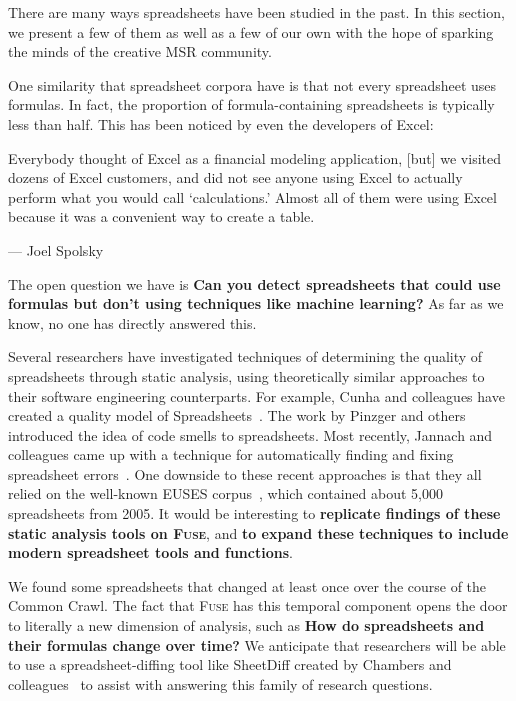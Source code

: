 \documentclass[conference]{IEEEtran}
\begin{document}
There are many ways spreadsheets have been studied in the past.  
In this section, we present a few of them as well as a few of our own with the hope of sparking the minds of the creative MSR community.

One similarity that spreadsheet corpora have is that not every spreadsheet uses formulas.  
In fact, the proportion of formula-containing spreadsheets is typically less than half.
This has been noticed by even the developers of Excel:
\begin{displayquote}
Everybody thought of Excel as a financial modeling application, [but] we visited dozens of Excel customers, and did not see anyone using Excel to actually perform what you would call `calculations.' Almost all of them were using Excel because it was a convenient way to create a table.

 --- Joel Spolsky~\cite{JoelOnSoftware}
\end{displayquote}
The open question we have is \textbf{Can you detect spreadsheets that could use formulas but don't using techniques like machine learning?}
As far as we know, no one has directly answered this.

Several researchers have investigated techniques of determining the quality of spreadsheets through static analysis, using theoretically similar approaches to their software engineering counterparts.
For example, Cunha and colleagues have created a quality model of Spreadsheets~\cite{Cunha2012}.
The work by Pinzger and others introduced the idea of code smells to spreadsheets\cite{Pinzger2012}.
Most recently, Jannach and colleagues came up with a technique for automatically finding and fixing spreadsheet errors~\cite{jannach2014}.
One downside to these recent approaches is that they all relied on the well-known EUSES corpus~\cite{Fisher2005}, which contained about 5,000 spreadsheets from 2005.
It would be interesting to \textbf{replicate findings of these static analysis tools on \textsc{Fuse}}, and \textbf{to expand these techniques to include modern spreadsheet tools and functions}.

We found some spreadsheets that changed at least once over the course of the Common Crawl.
The fact that \textsc{Fuse} has this temporal component opens the door to literally a new dimension of analysis, such as \textbf{How do spreadsheets and their formulas change over time?}
We anticipate that researchers will be able to use a spreadsheet-diffing tool like SheetDiff created by Chambers and colleagues~\cite{chambers2010} to assist with answering this family of research questions.
\end{document}

